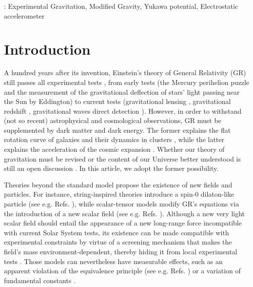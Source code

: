 \documentclass[12pt]{iopart}
\begin{document}
%
: Experimental Gravitation, Modified Gravity, Yukawa potential, Electrostatic accelerometer
%

\submitto{\CQG}
%
%
%




\section{Introduction}

A hundred years after its invention, Einstein's theory of General Relativity (GR) still passes all experimental tests \cite{will14}, from early tests (the Mercury perihelion puzzle and the measurement of the gravitational deflection of stars' light passing near the Sun by Eddington) to current tests (gravitational lensing \cite{bartelmann01, hoekstra08}, gravitational redshift \cite{delva18, herrmann18}, gravitational waves direct detection \cite{abbott16}).
However, in order to withstand (not so recent) astrophysical and cosmological observations, GR must be supplemented by dark matter and dark energy. The former explains the flat rotation curve of galaxies and their dynamics in clusters \cite{zwicky33, rubin70}, while the latter explains the acceleration of the cosmic expansion \cite{riess98, perlmutter99}. Whether our theory of gravitation must be revised or the content of our Universe better understood is still an open discussion \cite{joyce15, joyce16}. In this article, we adopt the former possibility.

Theories beyond the standard model propose the existence of new fields and particles. For instance, string-inspired theories introduce a spin-0 dilaton-like particle (see e.g. Refs. \cite{damour94, damour02}), while scalar-tensor models modify GR's equations via the introduction of a new scalar field (see e.g. Refs. \cite{damour92, clifton12, joyce15}). 
Although a new very light scalar field should entail the appearance of a new long-range force incompatible with current Solar System tests, its existence can be made compatible with experimental constraints by virtue of a screening mechanism that makes the field's mass environment-dependent, thereby hiding it from local experimental tests \cite{damour94,vainshtein72,Damour:1992kf,khoury04a, khoury04b, babichev09,hinterbichler10, brax13,burrage18}. Those models can nevertheless have measurable effects, such as an apparent violation of the equivalence principle (see e.g. Refs. \cite{khoury04b, damour12}) or a variation of fundamental constants \cite{uzan03, uzan11}.
\end{document}
